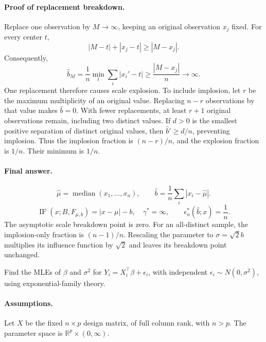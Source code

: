 \documentclass[answers,12pt,addpoints]{exam}
\providecommand{\R}{\mathbb{R}}
\providecommand{\IF}{\operatorname{IF}}
\providecommand{\GES}{\gamma^*}
\begin{document}
\begin{questions}
\begin{solution}
\paragraph{Proof of replacement breakdown.}
Replace one observation by $M\to\infty$, keeping an original
observation $x_j$ fixed. For every center $t$,
\[
|M-t|+|x_j-t|\geq|M-x_j|.
\]
Consequently,
\[
\widehat b_M=\frac1n\min_t\sum_i|x_i'-t|
\geq\frac{|M-x_j|}{n}\longrightarrow\infty.
\]
One replacement therefore causes scale explosion.
To include implosion, let $r$ be the maximum multiplicity of an
original value. Replacing $n-r$ observations by that value makes
$\widehat b=0$. With fewer replacements, at least $r+1$ original
observations remain, including two distinct values. If $d>0$ is
the smallest positive separation of distinct original values, then
$\widehat b'\geq d/n$, preventing implosion.
Thus the implosion fraction is $(n-r)/n$, and the explosion fraction
is $1/n$. Their minimum is $1/n$.

\paragraph{Final answer.}
\[
\boxed{\widehat\mu=\operatorname{median}(x_1,\ldots,x_n),\qquad
\widehat b=\frac1n\sum_i|x_i-\widehat\mu|.}
\]
\[
\boxed{\IF(x;B,F_{\mu,b})=|x-\mu|-b,\quad \GES=\infty,
\qquad \epsilon_n^*(\widehat b;x)=\frac1n.}
\]
The asymptotic scale breakdown point is zero. For an all-distinct
sample, the implosion-only fraction is $(n-1)/n$. Rescaling the
parameter to $\sigma=\sqrt2 b$ multiplies its influence function by
$\sqrt2$ and leaves its breakdown point unchanged.
\end{solution}

\question
Find the MLEs of $\beta$ and $\sigma^2$ for
$Y_i=X_i^\top\beta+\epsilon_i$, with independent
$\epsilon_i\sim N(0,\sigma^2)$, using exponential-family theory.

\begin{solution}
\paragraph{Assumptions.}
Let $X$ be the fixed $n\times p$ design matrix, of full column rank,
with $n>p$. The parameter space is $\R^p\times(0,\infty)$.


\end{solution}
\end{questions}
\end{document}
